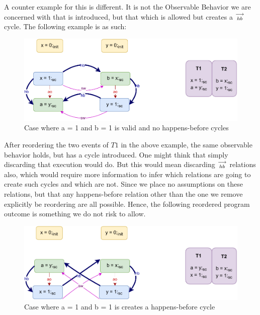         A counter example for this is different. It is not the Observable Behavior we are concerned with that is introduced, but that which is allowed but creates a $\stackrel{\longrightarrow}{_{hb}}$ cycle. The following example is as such:
        \begin{figure}[H]
            \centering
            \includegraphics[scale=0.7]{5.InstructionReordering/4.ValidReorderingCandidate/Example5(Wsc-Rsc).pdf}
            \caption{Case where a = 1 and b = 1 is valid and no happens-before cycles}
        \end{figure}

        After reordering the two events of $T1$ in the above example, the same observable behavior holds, but has a cycle introduced. One might think that simply discarding that execution would do. But this would mean discarding $\stackrel{\longrightarrow}{_{hb}}$ relations also, which would require more information to infer which relations are going to create such cycles and which are not. Since we place no assumptions on these relations, but that any happens-before relation other than the one we remove explicitly be reordering are all possible. Hence, the following reordered program outcome is something we do not risk to allow.

        \begin{figure}[H]
            \centering
            \includegraphics[scale=0.7]{5.InstructionReordering/4.ValidReorderingCandidate/Example5R(Wsc-Rsc).pdf}
            \caption{Case where a = 1 and b = 1 is creates a happens-before cycle}
        \end{figure}

